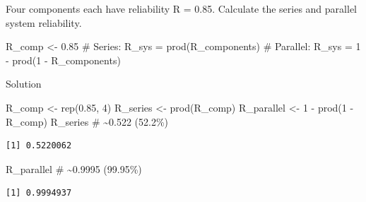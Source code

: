 \documentclass[
  letterpaper,
  DIV=11,
  numbers=noendperiod]{scrreprt}
\newenvironment{Shaded}{\begin{snugshade}}{\end{snugshade}}
\newcommand{\CommentTok}[1]{\textcolor[rgb]{0.37,0.37,0.37}{#1}}
\newcommand{\DecValTok}[1]{\textcolor[rgb]{0.68,0.00,0.00}{#1}}
\newcommand{\FloatTok}[1]{\textcolor[rgb]{0.68,0.00,0.00}{#1}}
\newcommand{\FunctionTok}[1]{\textcolor[rgb]{0.28,0.35,0.67}{#1}}
\newcommand{\NormalTok}[1]{\textcolor[rgb]{0.00,0.23,0.31}{#1}}
\newcommand{\OtherTok}[1]{\textcolor[rgb]{0.00,0.23,0.31}{#1}}
\newcommand{\SpecialCharTok}[1]{\textcolor[rgb]{0.37,0.37,0.37}{#1}}
\begin{document}
\begin{tcolorbox}[enhanced jigsaw, arc=.35mm, bottomrule=.15mm, bottomtitle=1mm, breakable, colback=white, colbacktitle=quarto-callout-note-color!10!white, colframe=quarto-callout-note-color-frame, coltitle=black, left=2mm, leftrule=.75mm, opacityback=0, opacitybacktitle=0.6, rightrule=.15mm, title=\textcolor{quarto-callout-note-color}{\faInfo}\hspace{0.5em}{Try It}, titlerule=0mm, toprule=.15mm, toptitle=1mm]

Four components each have reliability R = 0.85. Calculate the series and
parallel system reliability.

\begin{Shaded}
\begin{Highlighting}[]
\NormalTok{R\_comp }\OtherTok{\textless{}{-}} \FloatTok{0.85}
\CommentTok{\# Series:   R\_sys = prod(R\_components)}
\CommentTok{\# Parallel: R\_sys = 1 {-} prod(1 {-} R\_components)}
\end{Highlighting}
\end{Shaded}

Solution

\begin{Shaded}
\begin{Highlighting}[]
\NormalTok{R\_comp }\OtherTok{\textless{}{-}} \FunctionTok{rep}\NormalTok{(}\FloatTok{0.85}\NormalTok{, }\DecValTok{4}\NormalTok{)}
\NormalTok{R\_series   }\OtherTok{\textless{}{-}} \FunctionTok{prod}\NormalTok{(R\_comp)}
\NormalTok{R\_parallel }\OtherTok{\textless{}{-}} \DecValTok{1} \SpecialCharTok{{-}} \FunctionTok{prod}\NormalTok{(}\DecValTok{1} \SpecialCharTok{{-}}\NormalTok{ R\_comp)}
\NormalTok{R\_series    }\CommentTok{\# \textasciitilde{}0.522 (52.2\%)}
\end{Highlighting}
\end{Shaded}

\begin{verbatim}
[1] 0.5220062
\end{verbatim}

\begin{Shaded}
\begin{Highlighting}[]
\NormalTok{R\_parallel  }\CommentTok{\# \textasciitilde{}0.9995 (99.95\%)}
\end{Highlighting}
\end{Shaded}

\begin{verbatim}
[1] 0.9994937
\end{verbatim}

\end{tcolorbox}
\end{document}
